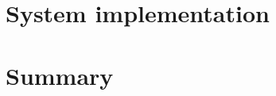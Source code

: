 \documentclass[thesis.tex]{subfiles}
\begin{document}
\section{System implementation} \label{sec:system_implementation}

\section{Summary} \label{sec:C3-summary}
\end{document}
